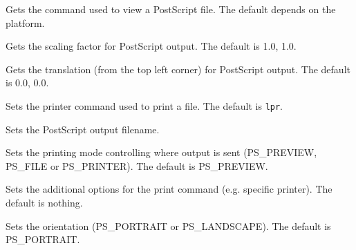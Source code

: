 

Gets the command used to view a PostScript file. The default depends on the platform.



Gets the scaling factor for PostScript output. The default is 1.0, 1.0.



Gets the translation (from the top left corner) for PostScript output. The default is 0.0, 0.0.



Sets the printer command used to print a file. The default is {\tt lpr}.



Sets the PostScript output filename.



Sets the printing mode controlling where output is sent (PS\_PREVIEW, PS\_FILE or PS\_PRINTER).
The default is PS\_PREVIEW.



Sets the additional options for the print command (e.g. specific printer). The default is nothing.



Sets the orientation (PS\_PORTRAIT or PS\_LANDSCAPE). The default is PS\_PORTRAIT.



